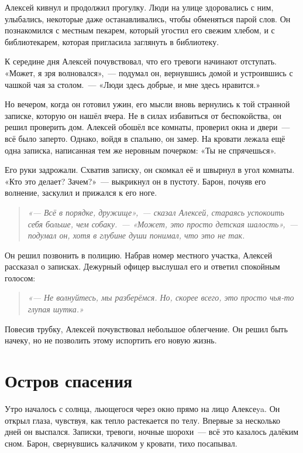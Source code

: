 \documentclass[12pt,a4paper]{book}
\newenvironment{dialogue}{\begin{quote}\itshape}{\end{quote}} %
\begin{document}
Алексей кивнул и продолжил прогулку. Люди на улице здоровались с ним, улыбались, некоторые даже останавливались, чтобы обменяться парой слов. Он познакомился с местным пекарем, который угостил его свежим хлебом, и с библиотекарем, которая пригласила заглянуть в библиотеку.

К середине дня Алексей почувствовал, что его тревоги начинают отступать. «Может, я зря волновался»,~--- подумал он, вернувшись домой и устроившись с чашкой чая за столом.~--- «Люди здесь добрые, и мне здесь нравится.»

Но вечером, когда он готовил ужин, его мысли вновь вернулись к той странной записке, которую он нашёл вчера. Не в силах избавиться от беспокойства, он решил проверить дом. Алексей обошёл все комнаты, проверил окна и двери~--- всё было заперто. Однако, войдя в спальню, он замер. На кровати лежала ещё одна записка, написанная тем же неровным почерком: «Ты не спрячешься».

Его руки задрожали. Схватив записку, он скомкал её и швырнул в угол комнаты. «Кто это делает? Зачем?»~--- выкрикнул он в пустоту. Барон, почуяв его волнение, заскулил и прижался к его ноге.

\begin{dialogue}
«--- Всё в порядке, дружище»,~--- сказал Алексей, стараясь успокоить себя больше, чем собаку.~--- «Может, это просто детская шалость»,~--- подумал он, хотя в глубине души понимал, что это не так.
\end{dialogue}

Он решил позвонить в полицию. Набрав номер местного участка, Алексей рассказал о записках. Дежурный офицер выслушал его и ответил спокойным голосом:

\begin{dialogue}
«--- Не волнуйтесь, мы разберёмся. Но, скорее всего, это просто чья-то глупая шутка.»
\end{dialogue}

Повесив трубку, Алексей почувствовал небольшое облегчение. Он решил быть начеку, но не позволить этому испортить его новую жизнь.

\chapter{Остров спасения}

Утро началось с солнца, льющегося через окно прямо на лицо Алексеya. Он открыл глаза, чувствуя, как тепло растекается по телу. Впервые за несколько дней он выспался. Записки, тревоги, ночные шорохи~--- всё это казалось далёким сном. Барон, свернувшись калачиком у кровати, тихо посапывал.
\end{document}
